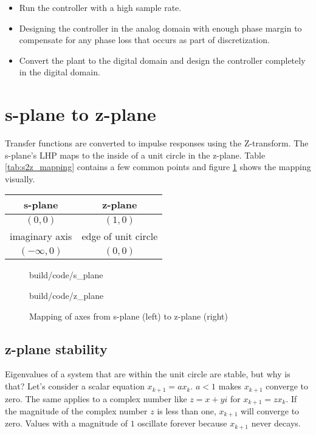 \begin{itemize}
  \item Run the controller with a high sample rate.
  \item Designing the controller in the analog domain with enough phase margin
    to compensate for any phase loss that occurs as part of discretization.
  \item Convert the \gls{plant} to the digital domain and design the controller
    completely in the digital domain.
\end{itemize}

\section{s-plane to z-plane}

Transfer functions are converted to impulse responses using the Z-transform. The
s-plane's LHP maps to the inside of a unit circle in the z-plane. Table
\ref{tab:s2z_mapping} contains a few common points and figure
\ref{fig:s2z_mapping} shows the mapping visually.

\begin{booktable}
  \begin{tabular}{|cc|}
    \hline
    \rowcolor{headingbg}
    \textbf{s-plane} & \textbf{z-plane} \\
    \hline
    $(0, 0)$ & $(1, 0)$ \\
    imaginary axis & edge of unit circle \\
    $(-\infty, 0)$ & $(0, 0)$ \\
    \hline
  \end{tabular}
  \caption{Mapping from s-plane to z-plane}
  \label{tab:s2z_mapping}
\end{booktable}

\begin{figure}
  \begin{minisvg}{build/code/s_plane}
  \end{minisvg}
  \begin{minisvg}{build/code/z_plane}
  \end{minisvg}
  \caption{Mapping of axes from s-plane (left) to z-plane (right)}
  \label{fig:s2z_mapping}
\end{figure}

\subsection{z-plane stability}

Eigenvalues of a system that are within the unit circle are stable, but why is
that? Let's consider a scalar equation $x_{k + 1} = ax_k$. $a < 1$ makes
$x_{k + 1}$ converge to zero. The same applies to a complex number like
$z = x + yi$ for $x_{k + 1} = zx_k$. If the magnitude of the complex number $z$
is less than one, $x_{k+1}$ will converge to zero. Values with a magnitude of
$1$ oscillate forever because $x_{k+1}$ never decays.

